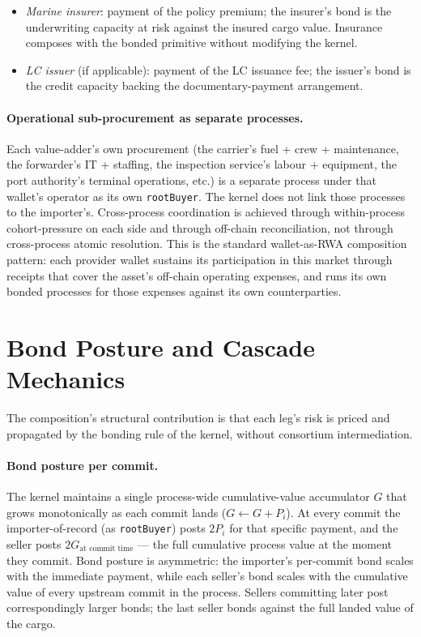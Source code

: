 \documentclass[11pt,a4paper]{article}
\theoremstyle{definition}
\theoremstyle{remark}
\begin{document}
\begin{itemize}
    under the relevant tariff schedule, the authority continues
    to operate off-chain. Both functions sit in the same wallet
    operationally; only the first is kernel-visible.
     treats the dual function in detail.
  \item \emph{Marine insurer}: payment of the policy premium;
    the insurer's bond is the underwriting capacity at risk
    against the insured cargo value. Insurance composes with
    the bonded primitive without modifying the kernel.
  \item \emph{LC issuer} (if applicable): payment of the LC
    issuance fee; the issuer's bond is the credit capacity
    backing the documentary-payment arrangement.
\end{itemize}

\paragraph{Operational sub-procurement as separate processes.}
Each value-adder's own procurement (the carrier's fuel + crew +
maintenance, the forwarder's IT + staffing, the inspection
service's labour + equipment, the port authority's terminal
operations, etc.) is a separate process under that wallet's
operator as its own \texttt{rootBuyer}. The kernel does not link
those processes to the importer's. Cross-process coordination is
achieved through within-process cohort-pressure on each side and
through off-chain reconciliation, not through cross-process atomic
resolution. This is the standard wallet-as-RWA composition
pattern: each provider wallet sustains its participation in this
market through receipts that cover the asset's off-chain
operating expenses, and runs its own bonded processes for those
expenses against its own counterparties.

\section{Bond Posture and Cascade Mechanics}
\label{sec:bonds}

The composition's structural contribution is that each leg's
risk is priced and propagated by the bonding rule of the kernel,
without consortium intermediation.

\paragraph{Bond posture per commit.}
The kernel maintains a single process-wide cumulative-value
accumulator $G$ that grows monotonically as each commit lands
($G \leftarrow G + P_i$). At every commit the importer-of-record
(as \texttt{rootBuyer}) posts $2P_i$ for that specific payment,
and the seller posts $2G_{\text{at commit time}}$ --- the full
cumulative process value at the moment they commit. Bond posture
is asymmetric: the importer's per-commit bond scales with the
immediate payment, while each seller's bond scales with the
cumulative value of every upstream commit in the process. Sellers
committing later post correspondingly larger bonds; the last
seller bonds against the full landed value of the cargo.
\end{document}
